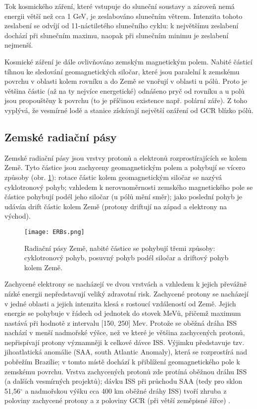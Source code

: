 Tok kosmického záření, které vstupuje do sluneční soustavy a zároveň nemá energii větší než cca 1 GeV, je zeslabováno slunečním větrem. Intenzita tohoto zeslabení se odvíjí od 11-náctiletého slunečního cyklu: k největšímu zeslabení dochází při slunečním maximu, naopak při slunečním minimu je zeslabení nejmenší. 

Kosmické záření je dále ovlivňováno zemským magnetickým polem. Nabité částicí tíhnou ke sledování geomagnetických siločar, které jsou paralelní k zemskému povrchu v oblasti kolem rovníku a do Země se vnořují v oblasti u pólů. Proto je většina částic (až na ty nejvíce energetické) odnášeno pryč od rovníku a u polů jsou propouštěny k povrchu (to je příčinou existence např. polární záře). Z toho vyplývá, že vesmírné lodě a stanice získávají největší ozáření od GCR blízko pólů.

\subsection{Zemské radiační pásy}
Zemské radiační pásy jsou vrstvy protonů a elektronů rozprostírajících se kolem Země. Tyto částice jsou zachyceny geomagnetickým polem a pohybují se vícero způsoby (obr. \ref{fig:ERBs}): rotace částic kolem geomagnetickým siločar se nazývá cyklotronový pohyb; vzhledem k nerovnoměrnosti zemského magnetického pole se částice pohybují podél jeho siločar (u pólů mění směr); jako poslední pohyb je udáván drift částic kolem Země (protony driftují na západ a elektrony na východ).

\begin{figure}[H]
  \centering
  \texttt{[image: ERBs.png]}
  \caption{Radiační pásy Země, nabité částice se pohybují třemi způsoby: cyklotronový pohyb, posuvný pohyb podél siločar a driftový pohyb kolem Země. \cite{benton}}
  \label{fig:ERBs}
\end{figure}

Zachycené elektrony se nacházejí ve dvou vrstvách a vzhledem k jejich převážně nízké energii nepředstavují veliký zdravotní risk. Zachycené protony se nacházejí v jedné oblasti a jejich intenzita klesá s rostoucí vzdáleností od Země. Jejich energie se pohybuje v řádech od jednotek do stovek MeVů, přičemž maximum nastává při hodnotě z intervalu [150, 250] Mev. Protože se oběžná dráha ISS nachází v menší nadmořské výšce, než ve které je většina zachycených protonů, nepřispívají protony významněji k celkové dávce ISS. Výjimku představuje tzv. jihoatlatická anomálie (SAA, south Atlantic Anomaly), která se rozprostírá nad pobřežím Brazílie; v tomto místě dochází k přiblížení geomagnetického pole k zemskému povrchu. Vrstva zachycených protonů zde protíná oběžnou dráhu
ISS (a dalších vesmírných projektů); dávku ISS při průchodu SAA (tedy pro sklon 51,56$^\circ$ a nadmořskou výšku cca 400 km oběžné dráhy ISS)  tvoří zhruba z poloviny zachycené protony a z poloviny GCR (při větší zeměpisné šířce) \cite{benton}. 

